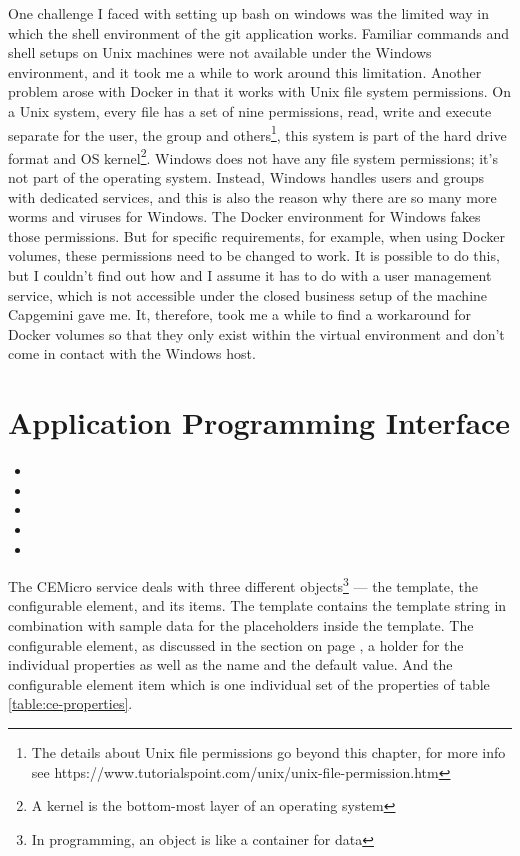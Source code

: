 One challenge I faced with setting up bash on windows was the limited way in which the shell environment of the git application works. Familiar commands and shell setups on Unix machines were not available under the Windows environment, and it took me a while to work around this limitation. Another problem arose with Docker in that it works with Unix file system permissions. On a Unix system, every file has a set of nine permissions, read, write and execute separate for the user, the group and others\footnote{The details about Unix file permissions go beyond this chapter, for more info see https://www.tutorialspoint.com/unix/unix-file-permission.htm}, this system is part of the hard drive format and OS kernel\footnote{A kernel is the bottom-most layer of an operating system}. Windows does not have any file system permissions; it's not part of the operating system. Instead, Windows handles users and groups with dedicated services, and this is also the reason why there are so many more worms and viruses for Windows. The Docker environment for Windows fakes those permissions. But for specific requirements, for example, when using Docker volumes, these permissions need to be changed to work. It is possible to do this, but I couldn't find out how and I assume it has to do with a user management service, which is not accessible under the closed business setup of the machine Capgemini gave me. It, therefore, took me a while to find a workaround for Docker volumes so that they only exist within the virtual environment and don't come in contact with the Windows host.

\section{Application Programming Interface}
\label{sec:impl:api}

\begin{itemize}
  \item {}
  \item {}
  \item {}
  \item {}
  \item {}
\end{itemize}

The CEMicro service deals with three different objects\footnote{In programming, an object is like a container for data} — the template, the configurable element, and its items. The template contains the template string in combination with sample data for the placeholders inside the template. The configurable element, as discussed in the section on page \pageref{sec:arch:understanding}, a holder for the individual properties as well as the name and the default value. And the configurable element item which is one individual set of the properties of table \ref{table:ce-properties}.

